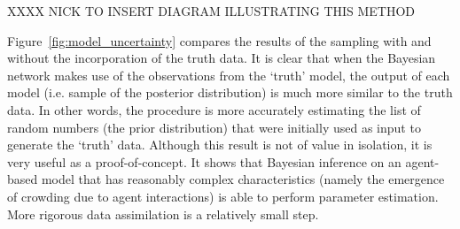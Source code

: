 \documentclass[runningheads]{llncs}
\begin{document}
XXXX NICK TO INSERT DIAGRAM ILLUSTRATING THIS METHOD


Figure~\ref{fig:model_uncertainty} compares the results of the sampling with and without the incorporation of the truth data. It is clear that when the Bayesian network makes use of the observations from the `truth' model, the output of each model (i.e. sample of the posterior distribution) is much more similar to the truth data. In other words, the procedure is more accurately estimating the list of random numbers (the prior distribution) that were initially used as input to generate the `truth' data. Although this result is not of value in isolation, it is very useful as a proof-of-concept. It shows that Bayesian inference on an agent-based model that has reasonably complex characteristics (namely the emergence of crowding due to agent interactions) is able to perform parameter estimation. More rigorous data assimilation is a relatively small step.

\end{document}

